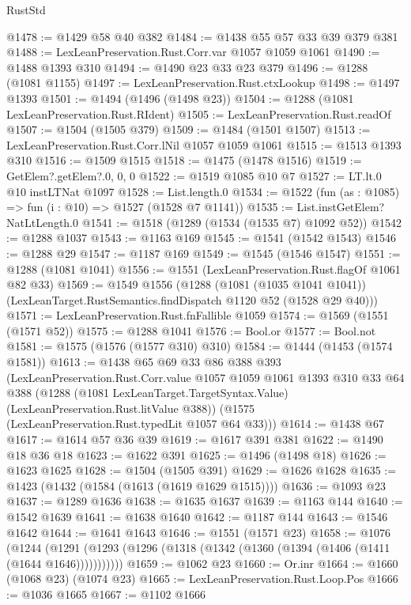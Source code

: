 \begin{lexlean}{RustStd}
\begin{coremodule}
{\begin{coremodule}
{{{{{{{{{{@1478 := @1429 @58 @40 @382
@1484 := @1438 @55 @57 @33 @39 @379 @381
@1488 := LexLeanPreservation.Rust.Corr.var @1057 @1059 @1061
@1490 := @1488 @1393 @310
@1494 := @1490 @23 @33 @23 @379
@1496 := @1288 (@1081 @1155)
@1497 := LexLeanPreservation.Rust.ctxLookup
@1498 := @1497 @1393
@1501 := @1494 (@1496 (@1498 @23))
@1504 := @1288 (@1081 LexLeanPreservation.Rust.RIdent)
@1505 := LexLeanPreservation.Rust.readOf
@1507 := @1504 (@1505 @379)
@1509 := @1484 (@1501 @1507)
@1513 := LexLeanPreservation.Rust.Corr.lNil @1057 @1059 @1061
@1515 := @1513 @1393 @310
@1516 := @1509 @1515
@1518 := @1475 (@1478 @1516)
@1519 := GetElem?.getElem?.{0, 0, 0}
@1522 := @1519 @1085 @10 @7
@1527 := LT.lt.{0} @10 instLTNat @1097
@1528 := List.length.{0}
@1534 := @1522 (fun (as : @1085) => fun (i : @10) => @1527 (@1528 @7 @1141))
@1535 := List.instGetElem?NatLtLength.{0}
@1541 := @1518 (@1289 (@1534 (@1535 @7) @1092 @52))
@1542 := @1288 @1037
@1543 := @1163 @169
@1545 := @1541 (@1542 @1543)
@1546 := @1288 @29
@1547 := @1187 @169
@1549 := @1545 (@1546 @1547)
@1551 := @1288 (@1081 @1041)
@1556 := @1551 (LexLeanPreservation.Rust.flagOf @1061 @82 @33)
@1569 := @1549
    @1556
    (@1288
      (@1081 (@1035 @1041 @1041))
      (LexLeanTarget.RustSemantics.findDispatch @1120 @52 (@1528 @29 @40)))
@1571 := LexLeanPreservation.Rust.fnFallible @1059
@1574 := @1569 (@1551 (@1571 @52))
@1575 := @1288 @1041
@1576 := Bool.or
@1577 := Bool.not
@1581 := @1575 (@1576 (@1577 @310) @310)
@1584 := @1444 (@1453 (@1574 @1581))
@1613 := @1438
    @65
    @69
    @33
    @86
    @388
    @393
    (LexLeanPreservation.Rust.Corr.value
      @1057
      @1059
      @1061
      @1393
      @310
      @33
      @64
      @388
      (@1288 (@1081 LexLeanTarget.TargetSyntax.Value) (LexLeanPreservation.Rust.litValue @388))
      (@1575 (LexLeanPreservation.Rust.typedLit @1057 @64 @33)))
@1614 := @1438 @67
@1617 := @1614 @57 @36 @39
@1619 := @1617 @391 @381
@1622 := @1490 @18 @36 @18
@1623 := @1622 @391
@1625 := @1496 (@1498 @18)
@1626 := @1623 @1625
@1628 := @1504 (@1505 @391)
@1629 := @1626 @1628
@1635 := @1423 (@1432 (@1584 (@1613 (@1619 @1629 @1515))))
@1636 := @1093 @23
@1637 := @1289 @1636
@1638 := @1635 @1637
@1639 := @1163 @144
@1640 := @1542 @1639
@1641 := @1638 @1640
@1642 := @1187 @144
@1643 := @1546 @1642
@1644 := @1641 @1643
@1646 := @1551 (@1571 @23)
@1658 := @1076
    (@1244 (@1291 (@1293 (@1296 (@1318 (@1342 (@1360 (@1394 (@1406 (@1411 (@1644 @1646)))))))))))
@1659 := @1062 @23
@1660 := Or.inr
@1664 := @1660 (@1068 @23) (@1074 @23)
@1665 := LexLeanPreservation.Rust.Loop.Pos
@1666 := @1036 @1665
@1667 := @1102 @1666
}}}}}}}}}}
\end{coremodule}}
\end{coremodule}
\end{lexlean}
